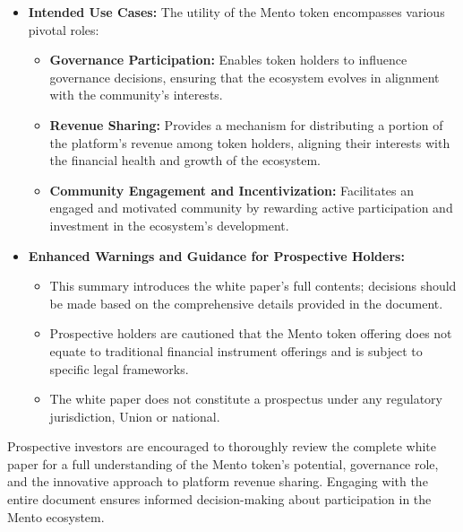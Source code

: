 \documentclass[a4paper]{article}
\theoremstyle{definition}
\begin{document}
\begin{appendices}
\begin{itemize}
    \item \textbf{Intended Use Cases:}
    The utility of the Mento token encompasses various pivotal roles:
    \begin{itemize}
        \item \textbf{Governance Participation:} Enables token holders to influence governance decisions, ensuring that the ecosystem evolves in alignment with the community's interests.
        \item \textbf{Revenue Sharing:} Provides a mechanism for distributing a portion of the platform's revenue among token holders, aligning their interests with the financial health and growth of the ecosystem.
        \item \textbf{Community Engagement and Incentivization:} Facilitates an engaged and motivated community by rewarding active participation and investment in the ecosystem's development.
    \end{itemize}

    \item \textbf{Enhanced Warnings and Guidance for Prospective Holders:}
    \begin{itemize}
        \item This summary introduces the white paper's full contents; decisions should be made based on the comprehensive details provided in the document.
        \item Prospective holders are cautioned that the Mento token offering does not equate to traditional financial instrument offerings and is subject to specific legal frameworks.
        \item The white paper does not constitute a prospectus under any regulatory jurisdiction, Union or national.
    \end{itemize}
\end{itemize}

Prospective investors are encouraged to thoroughly review the complete white paper for a full understanding of the Mento token's potential, governance role, and the innovative approach to platform revenue sharing. Engaging with the entire document ensures informed decision-making about participation in the Mento ecosystem.



\end{appendices}

\newpage


\newpage
\end{document}
